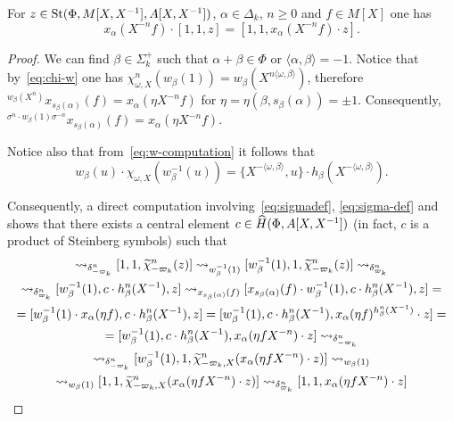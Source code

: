 \begin{cor}
\begin{lemma} \label{lem:family2}
    For $z \in \operatorname{St}(\Phi, M[X, X^{-1}], A[X, X^{-1}])$, $\alpha \in \Delta_k$, $n \geq 0$ and $f \in M[X]$ one has
    \begin{equation*} x_\alpha(X^{-n} f) \cdot [1, 1, z] = [1, 1, x_\alpha(X^{-n} f) \cdot z]. \end{equation*}
\end{lemma}
\begin{proof}
    We can find $\beta \in \Sigma_k^+$ such that $\alpha + \beta \in \Phi$ or $\langle \alpha, \beta \rangle = -1$.
    Notice that by~\eqref{eq:chi-w} one has $\chi_{\omega, X}^n(w_\beta(1)) = w_\beta(X^{n\langle \omega, \beta \rangle})$, therefore
    ${}^{w_\beta(X^n)} x_{s_\beta(\alpha)}(f) = x_\alpha(\eta X^{-n} f)$
    for $\eta = \eta(\beta, s_\beta(\alpha)) = \pm 1$.
    Consequently, ${}^{\sigma^n \cdot w_\beta(1) \sigma^{-n}} x_{s_\beta(\alpha)}(f) = x_\alpha(\eta X^{-n} f)$.

    Notice also that from~\eqref{eq:w-computation} it follows that
     \[ w_\beta(u) \cdot \chi_{\omega, X}(w^{-1}_\beta(u)) = \{ X^{-\langle \omega, \beta \rangle }, u \} \cdot h_\beta(X^{-\langle \omega, \beta \rangle}). \]

    Consequently, a direct computation involving~\eqref{eq:sigmadef}, \eqref{eq:sigma-def} and~\cite[Lemme~5.1--5.2]{Ma69}
     shows that there exists a central element $c \in \widehat{H}(\Phi, A[X, X^{-1}])$ (in fact, $c$ is a product of Steinberg symbols) such that
    \begin{multline*}
        [1, 1, z] \rightsquigarrow_{\delta_{-\varpi_k}^n}
        [1, 1, \widetilde{\chi}_{-\varpi_k}^n(z)] \rightsquigarrow_{w^{-1}_\beta(1)}
        [w_\beta^{-1}(1), 1, \widetilde{\chi}_{-\varpi_k}^n(z)] \rightsquigarrow_{\delta_{\varpi_k}^n} \\
        \rightsquigarrow_{\delta_{\varpi_k}^n} [w_\beta^{-1}(1), c \cdot h_\beta^n(X^{-1}), z] \rightsquigarrow_{x_{s_\beta(\alpha)}(f)}
        [x_{s_\beta(\alpha)}(f) \cdot w_\beta^{-1}(1), c \cdot h_\beta^n(X^{-1}), z] = \\
        = [w_\beta^{-1}(1) \cdot x_{\alpha}(\eta f), c \cdot h_\beta^n(X^{-1}), z] =
          [w_\beta^{-1}(1), c \cdot h_\beta^n(X^{-1}), x_{\alpha}(\eta f)^{h_\beta^n(X^{-1})} \cdot z] = \\
        = [w_\beta^{-1}(1), c \cdot h_\beta^n(X^{-1}), x_{\alpha}(\eta fX^{-n}) \cdot z] \rightsquigarrow_{\delta_{-\varpi_k}^n} \\
        \rightsquigarrow_{\delta_{-\varpi_k}^n} [w_\beta^{-1}(1), 1, \widetilde{\chi}_{-\varpi_k, X}^n (x_{\alpha}(\eta fX^{-n}) \cdot z)] \rightsquigarrow_{ w_\beta(1) } \\
        \rightsquigarrow_{ w_\beta(1) } [1, 1, \widetilde{\chi}_{-\varpi_k, X}^n (x_{\alpha}(\eta fX^{-n}) \cdot z)] \rightsquigarrow_{\delta_{\varpi_k}^n}
          [1, 1, x_{\alpha}(\eta fX^{-n}) \cdot z] \qedhere
    \end{multline*}
\end{proof}


\end{cor}
